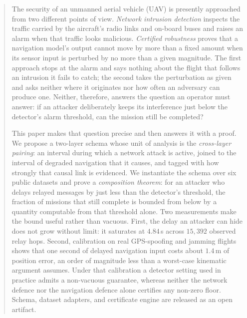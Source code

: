 \begin{abstract}
The security of an unmanned aerial vehicle (UAV) is presently approached from
two different points of view. \emph{Network intrusion detection} inspects the
traffic carried by the aircraft's radio links and on-board buses and raises an
alarm when that traffic looks malicious. \emph{Certified robustness} proves
that a navigation model's output cannot move by more than a fixed amount when
its sensor input is perturbed by no more than a given magnitude. The first
approach stops at the alarm and says nothing about the flight that follows an
intrusion it fails to catch; the second takes the perturbation as given and asks
neither where it originates nor how often an adversary can produce one. Neither,
therefore, answers the question an operator must answer: if an attacker
deliberately keeps its interference just below the detector's alarm threshold,
can the mission still be completed?

This paper makes that question precise and then answers it with a proof. We
propose a two-layer schema whose unit of analysis is the \emph{cross-layer
pairing}: an interval during which a network attack is active, joined to the
interval of degraded navigation that it causes, and tagged with how strongly
that causal link is evidenced. We instantiate the schema over six public
datasets and prove a \emph{composition theorem}: for an attacker who delays
relayed messages by just less than the detector's threshold, the fraction of
missions that still complete is bounded from below by a quantity computable from
that threshold alone. Two measurements make the bound useful rather than
vacuous. First, the delay an attacker can hide does not grow without limit: it
saturates at $4.84$\,s across $15{,}392$ observed relay hops. Second,
calibration on real GPS-spoofing and jamming flights shows that one second of
delayed navigation input costs about $1.4$\,m of position error, an order of
magnitude less than a worst-case kinematic argument assumes. Under that
calibration a detector setting used in practice admits a non-vacuous guarantee,
whereas neither the network defence nor the navigation defence alone certifies
any non-zero floor. Schema, dataset adapters, and certificate engine are
released as an open artifact.
\end{abstract}

